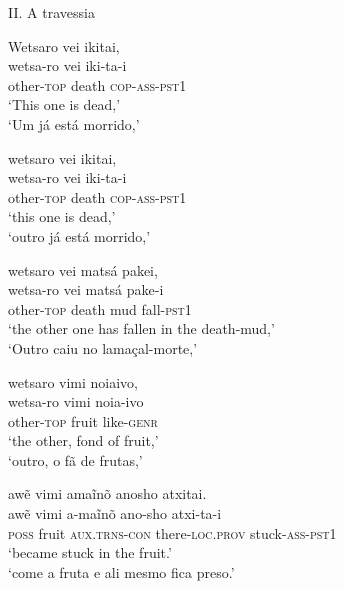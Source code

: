 \documentclass[output=paper,
modfonts,nonflat
]{langsci/langscibook}
\begin{document}
\noindent
II. A travessia%


\ea Wetsaro vei ikitai, \\[.3em]
\gll wetsa-ro           vei   iki-ta-i              \\
     other-\textsc{top} death \textsc{cop-ass-pst1} \\
\glt `This one is dead,' \\
`Um já está morrido,' \\
\z

\ea wetsaro vei ikitai, \\[.3em]
\gll wetsa-ro           vei   iki-ta-i              \\
     other-\textsc{top} death \textsc{cop-ass-pst1} \\
\glt `this one is dead,' \\
`outro já está morrido,'\footnotemark{}\\
\z

\ea wetsaro vei matsá pakei, \\[.3em]
\gll wetsa-ro           vei   matsá pake-i             \\
     other-\textsc{top} death mud   fall-\textsc{pst1} \\
\glt `the other one has fallen in the death-mud,' \\
`Outro caiu no lamaçal-morte,'\\
\z

\newpage 
\ea wetsaro vimi noiaivo, \\[.3em]
\gll wetsa-ro           vimi  noia-ivo           \\
     other-\textsc{top} fruit like-\textsc{genr} \\
\glt `the other, fond of fruit,' \\
`outro, o fã de frutas,' \\
\z

\ea awẽ vimi amaĩnõ anosho atxitai. \\[.3em]
\gll awẽ           vimi  a-maĩnõ               ano-sho                 atxi-ta-i               \\
     \textsc{poss} fruit \textsc{aux.trns-con} there-\textsc{loc.prov} stuck-\textsc{ass-pst1} \\
\glt `became stuck in the fruit.' \\
`come a fruta e ali mesmo fica preso.' \\
\z
\end{document}
